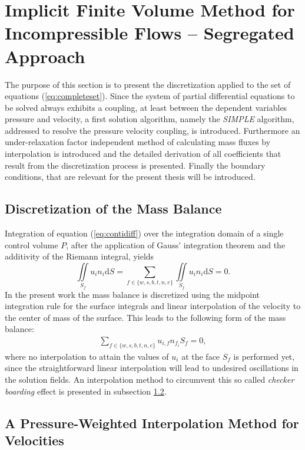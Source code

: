 \section{Implicit Finite Volume Method for Incompressible Flows -- Segregated Approach}
\label{sec:seg}

The purpose of this section is to present the discretization applied to the set of equations (\ref{eq:completeset}). Since the system of partial differential equations to be solved always exhibits a coupling, at least between the dependent variables pressure and velocity, a first solution algorithm, namely the \emph{SIMPLE} algorithm, addressed to resolve the pressure velocity coupling, is introduced. Furthermore an under-relaxation factor independent method of calculating mass fluxes by interpolation is introduced and the detailed derivation of all coefficients that result from the discretization process is presented. Finally the boundary conditions, that are relevant for the present thesis will be introduced.

\subsection{Discretization of the Mass Balance}

Integration of equation (\ref{eq:contidiff}) over the integration domain of a single control volume \(P\), after the application of Gauss' integration theorem and the additivity of the Riemann integral, yields
\begin{displaymath}
  \iint\limits_{S_f} u_i n_i \mathrm{d}S = \sum_{f \in \{w,s,b,t,n,e\}} \iint\limits_{S_f} u_i n_{i} \mathrm{d}S = 0.
\end{displaymath}
In the present work the mass balance is discretized using the midpoint integration rule for the surface integrals and linear interpolation of the velocity to the center of mass of the surface. This leads to the following form of the mass balance:
\begin{align}
  \label{eq:massbalance}
  \sum_{f \in \{w,s,b,t,n,e\}} u_{i,f} n_{f_i} S_f = 0,
\end{align}
where no interpolation to attain the values of \(u_i\) at the face \(S_f\) is performed yet, since the straightforward linear interpolation will lead to undesired oscillations in the solution fields. An interpolation method to circumvent this so called \emph{checker boarding} effect is presented in subsection \ref{sec:massflux}.

\subsection{A Pressure-Weighted Interpolation Method for Velocities}
\label{sec:massflux}

